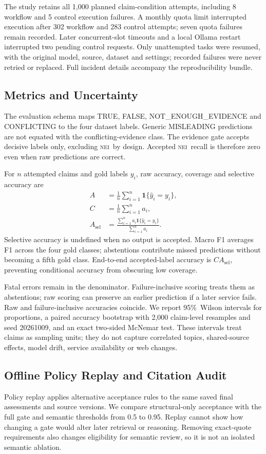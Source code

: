\documentclass[conference]{IEEEtran}
\newcommand{\NEI}{\textsc{nei}}
\newcommand{\pct}{\%}
\begin{document}
The study retains all 1,000 planned claim-condition attempts, including 8 workflow and 5 control execution failures. A monthly quota limit interrupted execution after 302 workflow and 283 control attempts; seven quota failures remain recorded. Later concurrent-slot timeouts and a local Ollama restart interrupted two pending control requests. Only unattempted tasks were resumed, with the original model, source, dataset and settings; recorded failures were never retried or replaced. Full incident details accompany the reproducibility bundle.

\subsection{Metrics and Uncertainty}
The evaluation schema maps TRUE, FALSE, NOT\_ENOUGH\_EVIDENCE and CONFLICTING to the four dataset labels. Generic MISLEADING predictions are not equated with the conflicting-evidence class. The evidence gate accepts decisive labels only, excluding \NEI\ by design. Accepted \NEI\ recall is therefore zero even when raw predictions are correct.

For $n$ attempted claims and gold labels $y_i$, raw accuracy, coverage and selective accuracy are
\begin{align}
A &= \frac{1}{n}\sum_{i=1}^{n}\mathbf{1}\{\hat y_i=y_i\},\\
C &= \frac{1}{n}\sum_{i=1}^{n}a_i,\\
A_{\mathrm{sel}} &=
\frac{\sum_{i=1}^{n}a_i\mathbf{1}\{\hat y_i=y_i\}}
{\sum_{i=1}^{n}a_i}.
\end{align}
Selective accuracy is undefined when no output is accepted. Macro F1 averages F1 across the four gold classes; abstentions contribute missed predictions without becoming a fifth gold class. End-to-end accepted-label accuracy is $C A_{\mathrm{sel}}$, preventing conditional accuracy from obscuring low coverage.

Fatal errors remain in the denominator. Failure-inclusive scoring treats them as abstentions; raw scoring can preserve an earlier prediction if a later service fails. Raw and failure-inclusive accuracies coincide. We report 95\pct\ Wilson intervals for proportions, a paired accuracy bootstrap with 2,000 claim-level resamples and seed 20261009, and an exact two-sided McNemar test. These intervals treat claims as sampling units; they do not capture correlated topics, shared-source effects, model drift, service availability or web changes.

\subsection{Offline Policy Replay and Citation Audit}
Policy replay applies alternative acceptance rules to the same saved final assessments and source versions. We compare structural-only acceptance with the full gate and semantic thresholds from 0.5 to 0.95. Replay cannot show how changing a gate would alter later retrieval or reasoning. Removing exact-quote requirements also changes eligibility for semantic review, so it is not an isolated semantic ablation.
\end{document}

